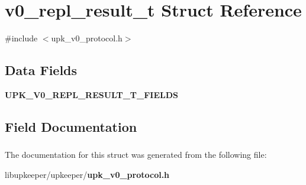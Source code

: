 \section{v0\_\-repl\_\-result\_\-t Struct Reference}
\label{structv0__repl__result__t}


{\ttfamily \#include $<$upk\_\-v0\_\-protocol.h$>$}

\subsection*{Data Fields}
\begin{DoxyCompactItemize}
\item 
{\bf UPK\_\-V0\_\-REPL\_\-RESULT\_\-T\_\-FIELDS}
\end{DoxyCompactItemize}


\subsection{Field Documentation}
\subsubsection[{UPK\_\-V0\_\-REPL\_\-RESULT\_\-T\_\-FIELDS}]{}\label{structv0__repl__result__t_a56b630ba015c389ca8c808cfabf68249}


The documentation for this struct was generated from the following file:\begin{DoxyCompactItemize}
\item 
libupkeeper/upkeeper/{\bf upk\_\-v0\_\-protocol.h}\end{DoxyCompactItemize}
